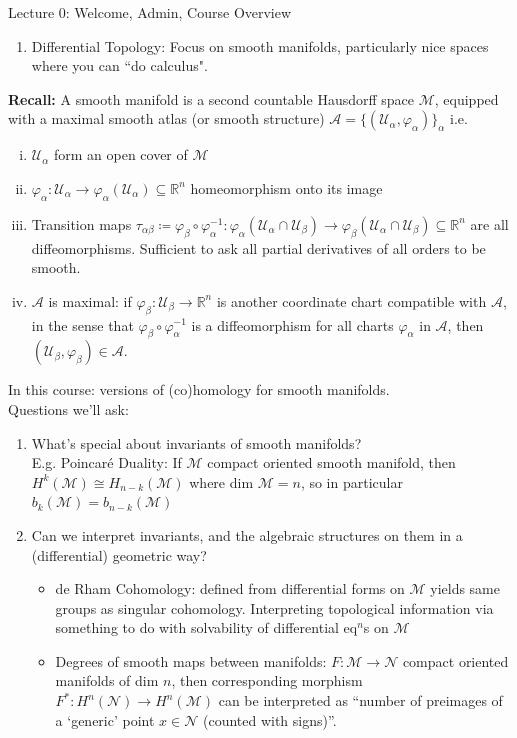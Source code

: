 \documentclass[10pt]{article}
\theoremstyle{plain}
\theoremstyle{definition}
\newcommand{\Recall}{\textbf{Recall: }}
\newcommand{\Real}{\mathbb{R}}
\newcommand{\man}{\mathcal{M}}
\newcommand{\nan}{\mathcal{N}}
\newcommand{\chartU}{\mathcal{U}}
\newcommand{\chart}{\varphi}
\newcommand{\Atlas}{\mathcal{A}}
\begin{document}
\begin{section}{Lecture 0: Welcome, Admin, Course Overview}
\begin{enumerate}
    \item Differential Topology: Focus on smooth manifolds, particularly nice spaces where you can ``do calculus". 
\end{enumerate}
\Recall A smooth manifold is a second countable Hausdorff space $\mathcal{M}$, equipped with a maximal smooth atlas (or smooth structure) $\mathcal{A} = \{(\mathcal{U}_{\alpha},\varphi_{\alpha})\}_{\alpha} $ i.e.
\begin{enumerate}[(i)]
    \item $\mathcal{U}_{\alpha}$ form an open cover of $\mathcal{M}$
    \item $\varphi_{\alpha} : \chartU_{\alpha} \to \varphi_{\alpha}(\mathcal{U}_{\alpha}) \subseteq \Real^n$ homeomorphism onto its image
    \item Transition maps $\tau_{\alpha\beta} \coloneqq \chart_{\beta} \circ \chart_{\alpha}^{-1} : \chart_{\alpha}(\chartU_{\alpha}\cap\chartU_{\beta}) \to \chart_{\beta}(\chartU_{\alpha}\cap\chartU_{\beta}) \subseteq \Real^n$ are all diffeomorphisms. Sufficient to ask all partial derivatives of all orders to be smooth.
    \item $\Atlas$ is maximal: if $\chart_{\beta} : \chartU_{\beta} \to \Real^n$ is another coordinate chart compatible with $\Atlas$, in the sense that $\chart_{\beta} \circ \chart_{\alpha} ^{-1}$ is a diffeomorphism for all charts $\chart_{\alpha}$ in $\Atlas$, then $(\chartU_{\beta},\chart_{\beta}) \in \Atlas$. 
\end{enumerate}
In this course: versions of (co)homology for smooth manifolds. \\Questions we'll ask:
\begin{enumerate}
    \item What's special about invariants of smooth manifolds?\\ E.g. Poincar\'e Duality: If $\man$ compact oriented smooth manifold, then $H^k(\man) \cong H_{n-k}(\man)$ where dim $\man = n$, so in particular $b_k(\man) = b_{n-k}(\man)$
    \item Can we interpret invariants, and the algebraic structures on them in a (differential) geometric way? \begin{itemize}
        \item  de Rham Cohomology: defined from differential forms on $\man$ yields same groups as singular cohomology. Interpreting topological information via something to do with solvability of differential eq$^n$s on $\man$
        \item  Degrees of smooth maps between manifolds: $F : \man\to\nan$ compact oriented manifolds of dim $n$, then corresponding morphism $F^* : H^n(\nan)\to H^n(\man)$ can be interpreted as ``number of preimages of a `generic' point $x\in \nan$ (counted with signs)''.

\end{itemize}
\end{enumerate}
\end{section}
\end{document}
